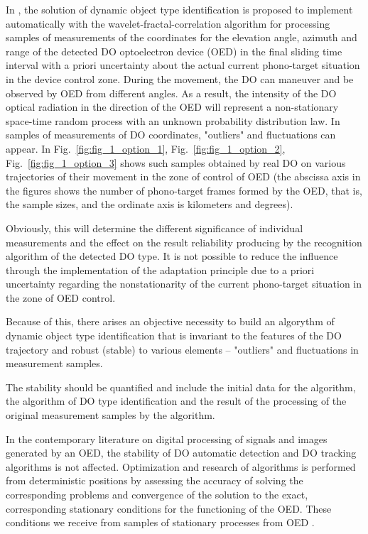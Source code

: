 In \cite{bib_01}, the solution of dynamic object type identification is proposed to implement automatically with the wavelet-fractal-correlation algorithm for processing samples of measurements of the coordinates for the elevation angle, azimuth and range of the detected DO optoelectron device (OED) in the final sliding time interval with a priori uncertainty about the actual current phono-target situation in the device control zone.
During the movement, the DO can maneuver and be observed by OED from different angles.
As a result, the intensity of the DO optical radiation in the direction of the OED will represent a non-stationary space-time random process with an unknown probability distribution law.
In samples of measurements of DO coordinates, "outliers" and fluctuations can appear.
In Fig.~\ref{fig:fig_1_option_1}, Fig.~\ref{fig:fig_1_option_2}, Fig.~\ref{fig:fig_1_option_3} shows such samples obtained by real DO on various trajectories of their movement in the zone of control of OED (the abscissa axis in the figures shows the number of phono-target frames formed by the OED, that is, the sample sizes, and the ordinate axis is kilometers and degrees).

Obviously, this will determine the different significance of individual measurements and the effect on the result reliability producing by the recognition algorithm of the detected DO type.
It is not possible to reduce the influence through the implementation of the adaptation principle due to a priori uncertainty regarding the nonstationarity of the current phono-target situation in the zone of OED control.

Because of this, there arises an objective necessity to build an algorythm of dynamic object type identification that is invariant to the features of the DO trajectory and robust (stable) to various elements -- "outliers" and fluctuations in measurement samples.

The stability should be quantified and include the initial data for the algorithm, the algorithm of DO type identification and the result of the processing of the original measurement samples by the algorithm.

In the contemporary literature on digital processing of signals and images generated by an OED, the stability of DO automatic detection and DO tracking algorithms is not affected. Optimization and research of algorithms is performed from deterministic positions by assessing the accuracy of solving the corresponding problems and convergence of the solution to the exact, corresponding stationary conditions for the functioning of the OED. These conditions we receive from samples of stationary processes from OED \cite{bib_02,bib_03,bib_04,bib_05,bib_06}.

